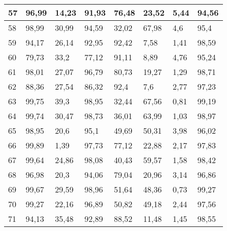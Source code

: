 \begin{longtable}[c]{|l|l|l|l|l|l|l|l|}
57              & 96,99        & 14,23        & 91,93       & 76,48         & 23,52         & 5,44          & 94,56         \\ \hline
58              & 98,99        & 30,99        & 94,59       & 32,02         & 67,98         & 4,6           & 95,4          \\ \hline
59              & 94,17        & 26,14        & 92,95       & 92,42         & 7,58          & 1,41          & 98,59         \\ \hline
60              & 79,73        & 33,2         & 77,12       & 91,11         & 8,89          & 4,76          & 95,24         \\ \hline
61              & 98,01        & 27,07        & 96,79       & 80,73         & 19,27         & 1,29          & 98,71         \\ \hline
62              & 88,36        & 27,54        & 86,32       & 92,4          & 7,6           & 2,77          & 97,23         \\ \hline
63              & 99,75        & 39,3         & 98,95       & 32,44         & 67,56         & 0,81          & 99,19         \\ \hline
64              & 99,74        & 30,47        & 98,73       & 36,01         & 63,99         & 1,03          & 98,97         \\ \hline
65              & 98,95        & 20,6         & 95,1        & 49,69         & 50,31         & 3,98          & 96,02         \\ \hline
66              & 99,89        & 1,39         & 97,73       & 77,12         & 22,88         & 2,17          & 97,83         \\ \hline
67              & 99,64        & 24,86        & 98,08       & 40,43         & 59,57         & 1,58          & 98,42         \\ \hline
68              & 96,98        & 20,3         & 94,06       & 79,04         & 20,96         & 3,14          & 96,86         \\ \hline
69              & 99,67        & 29,59        & 98,96       & 51,64         & 48,36         & 0,73          & 99,27         \\ \hline
70              & 99,27        & 22,16        & 96,89       & 50,82         & 49,18         & 2,44          & 97,56         \\ \hline
71              & 94,13        & 35,48        & 92,89       & 88,52         & 11,48         & 1,45          & 98,55         \\ \hline

\end{longtable}
